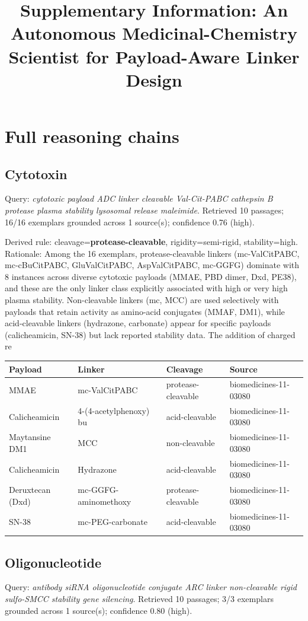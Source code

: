 \documentclass[10pt]{article}
\title{\textbf{Supplementary Information: An Autonomous Medicinal-Chemistry Scientist for Payload-Aware Linker Design}}
\author{}
\date{}
\begin{document}
\maketitle
\section{Full reasoning chains}
\subsection{Cytotoxin}
Query: \emph{cytotoxic payload ADC linker cleavable Val-Cit-PABC cathepsin B protease plasma stability lysosomal release maleimide}. Retrieved 10 passages; 16/16 exemplars grounded across 1 source(s); confidence 0.76 (high).

Derived rule: cleavage=\textbf{protease-cleavable}, rigidity=semi-rigid, stability=high. Rationale: Among the 16 exemplars, protease-cleavable linkers (mc-ValCitPABC, mc-cBuCitPABC, GluValCitPABC, AspValCitPABC, mc-GGFG) dominate with 8 instances across diverse cytotoxic payloads (MMAE, PBD dimer, Dxd, PE38), and these are the only linker class explicitly associated with high or very high plasma stability. Non-cleavable linkers (mc, MCC) are used selectively with payloads that retain activity as amino-acid conjugates (MMAF, DM1), while acid-cleavable linkers (hydrazone, carbonate) appear for specific payloads (calicheamicin, SN-38) but lack reported stability data. The addition of charged re
\begin{table}[h]\centering\scriptsize\begin{tabular}{l l l l}\toprule Payload & Linker & Cleavage & Source \\ \midrule MMAE & mc-ValCitPABC & protease-cleavable & biomedicines-11-03080 \\
Calicheamicin & 4-(4-acetylphenoxy) bu & acid-cleavable & biomedicines-11-03080 \\
Maytansine DM1 & MCC & non-cleavable & biomedicines-11-03080 \\
Calicheamicin & Hydrazone & acid-cleavable & biomedicines-11-03080 \\
Deruxtecan (Dxd) & mc-GGFG-aminomethoxy & protease-cleavable & biomedicines-11-03080 \\
SN-38 & mc-PEG-carbonate & acid-cleavable & biomedicines-11-03080 \\ \bottomrule\end{tabular}\end{table}
\subsection{Oligonucleotide}
Query: \emph{antibody siRNA oligonucleotide conjugate ARC linker non-cleavable rigid sulfo-SMCC stability gene silencing}. Retrieved 10 passages; 3/3 exemplars grounded across 1 source(s); confidence 0.80 (high).
\end{document}
